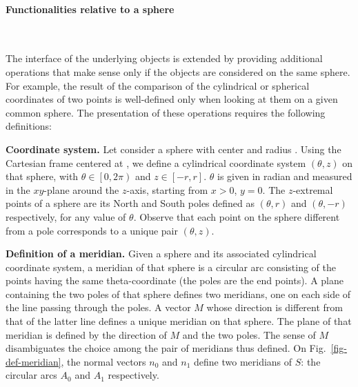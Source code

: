 \paragraph{Functionalities relative to a sphere}~

The interface of the underlying objects is extended by providing
additional operations that make sense only if the objects are
considered on the same sphere. For example, the result of the comparison of the
cylindrical or spherical coordinates of two points is well-defined
only when looking at them on a given common sphere. The presentation
of these operations requires the following definitions:

\textbf{Coordinate system.}
Let consider a sphere with center  and radius . Using
the Cartesian frame centered at , we define a cylindrical
coordinate system $(\theta,z)$ on that sphere, with $\theta \in \left[
  0,2\pi \right)$ and $z \in \left[ -r,r \right]$. $\theta$ is given
in radian and measured in the $xy$-plane around the $z$-axis, starting
from $x>0$, $y=0$. The $z$-extremal points of a sphere are its North
and South poles defined as $(\theta,r)$ and $(\theta,-r)$
respectively, for any value of $\theta$. Observe that each point on
the sphere different from a pole corresponds to a unique pair
$(\theta,z)$.

\textbf{Definition of a meridian.}
Given a sphere and its associated cylindrical coordinate system, a meridian of that
sphere is a circular arc consisting of the points having the same theta-coordinate
(the poles are the end points).
A plane containing the two poles of that sphere defines two meridians, one on each side
of the line passing through the poles. A vector $M$ whose direction is different from that of the latter
line defines a unique meridian on that sphere. The plane of that meridian is defined by the
direction of $M$ and the two poles. The sense of $M$ disambiguates the choice among the
pair of meridians thus defined.
On Fig.~\ref{fig-def-meridian}, the normal vectors $n_0$ and $n_1$ define 
two meridians of $S$: the circular arcs $A_0$ and $A_1$ respectively.

